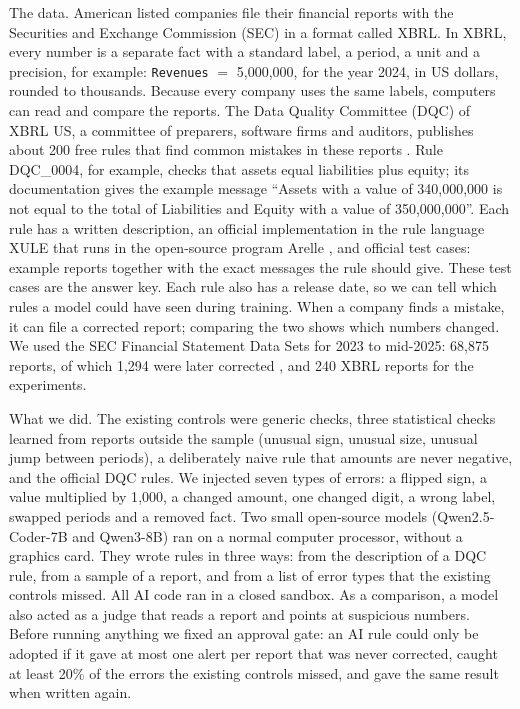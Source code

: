 \documentclass[11pt,a4paper]{article}
\begin{document}
The data. American listed companies file their financial reports with the Securities and Exchange Commission (SEC) in a format called XBRL. In XBRL, every number is a separate fact with a standard label, a period, a unit and a precision, for example: \texttt{Revenues} $=$ 5{,}000{,}000, for the year 2024, in US dollars, rounded to thousands. Because every company uses the same labels, computers can read and compare the reports. The Data Quality Committee (DQC) of XBRL US, a committee of preparers, software firms and auditors, publishes about 200 free rules that find common mistakes in these reports \cite{dqc}. Rule DQC\_0004, for example, checks that assets equal liabilities plus equity; its documentation gives the example message ``Assets with a value of 340,000,000 is not equal to the total of Liabilities and Equity with a value of 350,000,000''. Each rule has a written description, an official implementation in the rule language XULE that runs in the open-source program Arelle \cite{arelle}, and official test cases: example reports together with the exact messages the rule should give. These test cases are the answer key. Each rule also has a release date, so we can tell which rules a model could have seen during training. When a company finds a mistake, it can file a corrected report; comparing the two shows which numbers changed. We used the SEC Financial Statement Data Sets for 2023 to mid-2025: 68{,}875 reports, of which 1{,}294 were later corrected \cite{fsds}, and 240 XBRL reports for the experiments.

What we did. The existing controls were generic checks, three statistical checks learned from reports outside the sample (unusual sign, unusual size, unusual jump between periods), a deliberately naive rule that amounts are never negative, and the official DQC rules. We injected seven types of errors: a flipped sign, a value multiplied by 1{,}000, a changed amount, one changed digit, a wrong label, swapped periods and a removed fact. Two small open-source models (Qwen2.5-Coder-7B and Qwen3-8B) ran on a normal computer processor, without a graphics card. They wrote rules in three ways: from the description of a DQC rule, from a sample of a report, and from a list of error types that the existing controls missed. All AI code ran in a closed sandbox. As a comparison, a model also acted as a judge that reads a report and points at suspicious numbers. Before running anything we fixed an approval gate: an AI rule could only be adopted if it gave at most one alert per report that was never corrected, caught at least 20\% of the errors the existing controls missed, and gave the same result when written again.
\end{document}
